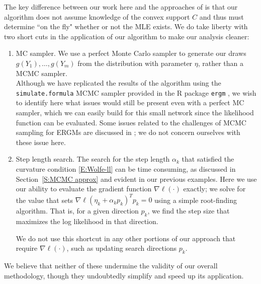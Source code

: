 The key difference between our work here and the approaches of 
\citep{Handcock:degeneracy,Rinaldo:2009} is that our algorithm does not assume
knowledge of the convex support $C$ and thus must determine ``on the fly" whether
or not the MLE exists.  
We do take liberty with two short cuts in the application of our algorithm to make 
our analysis cleaner:
\begin{enumerate}
\item MC sampler.  We use a perfect Monte Carlo sampler to generate our draws \\
$g(Y_1), \ldots, g(Y_m)$ from the distribution with parameter $\eta$, rather than a 
MCMC sampler. \\
 Although we have replicated the results of the algorithm using the 
 \texttt{simulate.formula} MCMC sampler provided in the R package \texttt{ergm} 
 \citep{ergm:R}, we wish to identify here what 
issues would still be present even with a perfect MC sampler, which we can easily build for 
this small network since the likelihood function can be evaluated.  Some issues 
related to the challenges of MCMC sampling for ERGMs are discussed in 
\citep{ergm,Morris:2008}; we do not concern ourselves with these issue here.

\item Step length search.  The search for the step length $\alpha_k$ that satisfied the 
curvature condition \eqref{E:Wolfe-ll} can be time consuming, as discussed in
Section~\ref{S:MCMC approx} and evident in our previous examples.
Here we use our ability to evaluate the gradient function $\nabla \ell(\cdot)$ exactly;  
we solve for the value that sets $\nabla \ell( \eta_k + \alpha_k p_k)^T p_k = 0$ 
using a simple root-finding algorithm.  That is, for a given 
direction $p_k$, we find the step size that maximizes the log likelihood in that 
direction.

We do not use this shortcut in any other portions of our approach that 
require $\nabla \ell(\cdot)$, 
such as updating search directions $p_k$.

\end{enumerate}
We believe that neither of these undermine the validity of our overall methodology, 
though they undoubtedly simplify and speed up its application.




